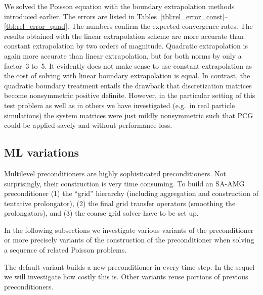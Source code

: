 We solved the Poisson equation with the boundary extrapolation methods
introduced earlier.  The errors are listed in
Tables~\ref{tbl:rel_error_const}--\ref{tbl:rel_error_quad}.  The numbers
confirm the expected convergence rates.  The results obtained with the
linear extrapolation scheme are more accurate than constant
extrapolation by two orders of magnitude.  Quadratic extrapolation is
again more accurate than linear extrapolation, but for both norms by
only a factor~3 to~5.  It evidently does not make sense to use constant
extrapolation as the cost of solving with linear boundary extrapolation
is equal.  In contrast, the quadratic boundary treatment entails the
drawback that discretization matrices become nonsymmetric positive
definite.  However, in the particular setting of this test problem as
well as in others we have investigated (e.g.\ in real particle
simulations) the system matrices were just mildly nonsymmetric such that
PCG could be applied savely and without performance loss.



\subsection{ML variations}\label{sec:ml_var}

Multilevel preconditioners are highly sophisticated preconditioners.
Not surprisingly, their construction is very time consuming.  To build
an SA-AMG preconditioner (1) the ``grid'' hierarchy (including
aggregation and construction of tentative prolongator), (2) the final
grid transfer operators (smoothing the prolongators), and (3) the coarse
grid solver have to be set up.

In the following subsections we investigate various variants of the
preconditioner or more precisely variants of the construction of the
preconditioner when solving a sequence of related Poisson problems.

The default variant builds a new preconditioner in every time step.  In
the sequel we will investigate how costly this is.  Other variants reuse
portions of previous preconditioners.


